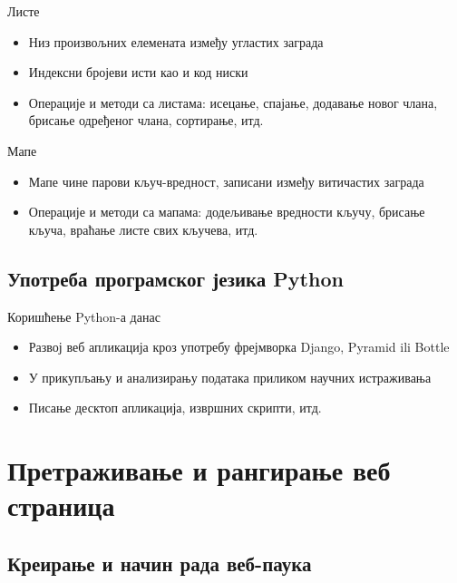 \documentclass[11pt, serbianc, english]{beamer}
\begin{document}
\begin{frame}{Листе}
    \begin{itemize}
            \item Низ произвољних елемената између угластих заграда
            \pause
            \item Индексни бројеви исти као и код ниски
            \pause
            \item Операције и методи са листама: исецање, спајање, додавање новог члана, брисање одређеног члана, сортирање, итд.
            \pause
    \end{itemize}
\end{frame}

\begin{frame}{Мапе}
    \begin{itemize}
            \item Мапе чине парови кључ-вредност, записани између витичастих заграда
            \pause
            \item Операције и методи са мапама: додељивање вредности кључу, брисање кључа, враћање листе свих кључева, итд.
    \end{itemize}
\end{frame}


\subsection{Употреба програмског језика Python}

\begin{frame}{Коришћење Python-а данас}
    \begin{itemize}
            \item Развој веб апликација кроз употребу фрејмворка Django, Pyramid ili Bottle
            \pause
            \item У прикупљању и анализирању података приликом научних истраживања
            \pause
            \item Писање десктоп апликација, извршних скрипти, итд.
    \end{itemize}
\end{frame}

\section{Претраживање и рангирање веб страница}

\subsection{Креирање и начин рада веб-паука}
\end{document}
